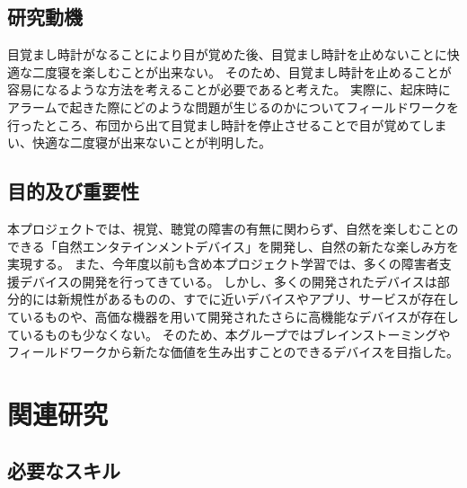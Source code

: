 \section{研究動機}
目覚まし時計がなることにより目が覚めた後、目覚まし時計を止めないことに快適な二度寝を楽しむことが出来ない。
そのため、目覚まし時計を止めることが容易になるような方法を考えることが必要であると考えた。
実際に、起床時にアラームで起きた際にどのような問題が生じるのかについてフィールドワークを行ったところ、布団から出て目覚まし時計を停止させることで目が覚めてしまい、快適な二度寝が出来ないことが判明した。

\section{目的及び重要性}
本プロジェクトでは、視覚、聴覚の障害の有無に関わらず、自然を楽しむことのできる「自然エンタテインメントデバイス」を開発し、自然の新たな楽しみ方を実現する。
また、今年度以前も含め本プロジェクト学習では、多くの障害者支援デバイスの開発を行ってきている。
しかし、多くの開発されたデバイスは部分的には新規性があるものの、すでに近いデバイスやアプリ、サービスが存在しているものや、高価な機器を用いて開発されたさらに高機能なデバイスが存在しているものも少なくない。
そのため、本グループではブレインストーミングやフィールドワークから新たな価値を生み出すことのできるデバイスを目指した。

\chapter{関連研究}
\section{必要なスキル}

